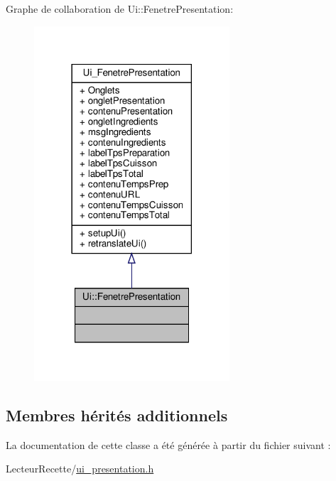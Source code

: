 Graphe de collaboration de Ui\+:\+:Fenetre\+Presentation\+:
\nopagebreak
\begin{figure}[H]
\begin{center}
\leavevmode
\includegraphics[width=206pt]{class_ui_1_1_fenetre_presentation__coll__graph}
\end{center}
\end{figure}
\subsection*{Membres hérités additionnels}


La documentation de cette classe a été générée à partir du fichier suivant \+:\begin{DoxyCompactItemize}
\item 
Lecteur\+Recette/\hyperlink{ui__presentation_8h}{ui\+\_\+presentation.\+h}\end{DoxyCompactItemize}
